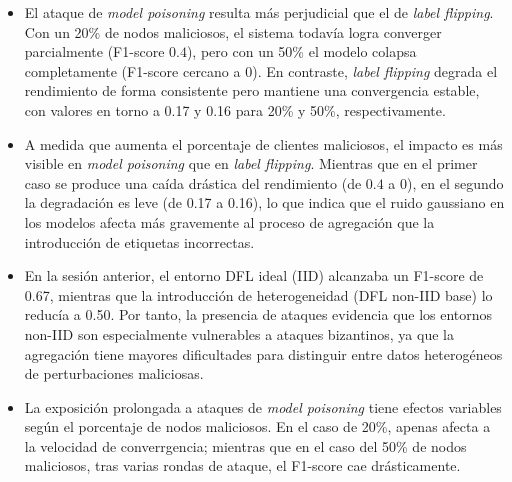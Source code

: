 
\begin{itemize}
    \item El ataque de \textit{model poisoning} resulta más perjudicial que el de \textit{label flipping}. Con un 20\% de nodos maliciosos, el sistema todavía logra converger parcialmente (F1-score $0.4$), pero con un 50\% el modelo colapsa completamente (F1-score cercano a 0). En contraste, \textit{label flipping} degrada el rendimiento de forma consistente pero mantiene una convergencia estable, con valores en torno a 0.17 y 0.16 para 20\% y 50\%, respectivamente.
    
    \item A medida que aumenta el porcentaje de clientes maliciosos, el impacto es más visible en \textit{model poisoning} 
    que en \textit{label flipping}. Mientras que en el primer caso se produce una caída drástica del rendimiento 
    (de $0.4$ a $0$), en el segundo la degradación es leve (de 0.17 a 0.16), lo que indica que el ruido gaussiano 
    en los modelos afecta más gravemente al proceso de agregación que la introducción de etiquetas incorrectas.
    
    \item En la sesión anterior, el entorno DFL ideal (IID) alcanzaba un F1-score de 0.67, mientras que la introducción de heterogeneidad (DFL non-IID base) lo reducía a 0.50. Por tanto, la presencia de ataques evidencia que los entornos non-IID son especialmente vulnerables a ataques bizantinos, ya que la agregación tiene mayores dificultades para distinguir entre datos heterogéneos de perturbaciones maliciosas.
    \item La exposición prolongada a ataques de \textit{model poisoning} tiene efectos variables según 
    el porcentaje de nodos maliciosos. En el caso de 20\%, apenas afecta a la velocidad de converrgencia; 
    mientras que en el caso del 50\% de nodos maliciosos, tras varias rondas de ataque, el F1-score cae drásticamente.
\end{itemize}


